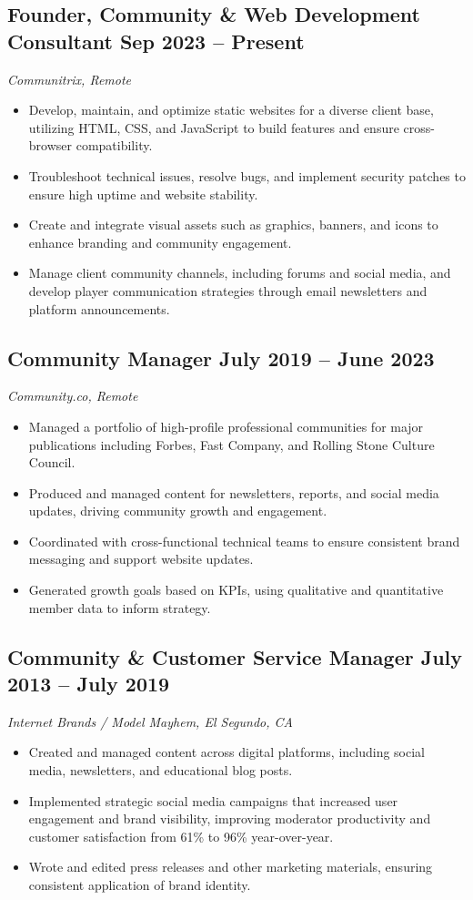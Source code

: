 \documentclass[a4paper,12pt]{article} %
\begin{document}
\subsection{Founder, Community \& Web Development Consultant \hfill Sep 2023 – Present}
\textit{Communitrix, Remote}
\begin{itemize}
    \item Develop, maintain, and optimize static websites for a diverse client base, utilizing HTML, CSS, and JavaScript to build features and ensure cross-browser compatibility.
    \item Troubleshoot technical issues, resolve bugs, and implement security patches to ensure high uptime and website stability.
    \item Create and integrate visual assets such as graphics, banners, and icons to enhance branding and community engagement.
    \item Manage client community channels, including forums and social media, and develop player communication strategies through email newsletters and platform announcements.
\end{itemize}

\subsection{Community Manager \hfill July 2019 – June 2023}
\textit{Community.co, Remote}
\begin{itemize}
    \item Managed a portfolio of high-profile professional communities for major publications including Forbes, Fast Company, and Rolling Stone Culture Council.
    \item Produced and managed content for newsletters, reports, and social media updates, driving community growth and engagement.
    \item Coordinated with cross-functional technical teams to ensure consistent brand messaging and support website updates.
    \item Generated growth goals based on KPIs, using qualitative and quantitative member data to inform strategy.
\end{itemize}

\subsection{Community \& Customer Service Manager \hfill July 2013 – July 2019}
\textit{Internet Brands / Model Mayhem, El Segundo, CA}
\begin{itemize}
    \item Created and managed content across digital platforms, including social media, newsletters, and educational blog posts.
    \item Implemented strategic social media campaigns that increased user engagement and brand visibility, improving moderator productivity and customer satisfaction from 61\% to 96\% year-over-year.
    \item Wrote and edited press releases and other marketing materials, ensuring consistent application of brand identity.
\end{itemize}
\end{document}

